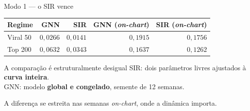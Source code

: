 \documentclass[aspectratio=169]{beamer}
\newcommand{\dest}[1]{\textcolor{ufprB}{\textbf{#1}}}
\begin{document}
\begin{frame}{Modo 1 --- o SIR vence}
  \begin{center}
  \begin{tabular}{lrrrr}
  \toprule
  \textbf{Regime} & \textbf{GNN} & \textbf{SIR} & \textbf{GNN (\emph{on-chart})} & \textbf{SIR (\emph{on-chart})} \\
  \midrule
  Viral 50 & $0{,}0266$ & \dest{$0{,}0141$} & $0{,}1915$ & \dest{$0{,}1756$} \\
  Top 200  & $0{,}0632$ & \dest{$0{,}0343$} & $0{,}1637$ & \dest{$0{,}1262$} \\
  \bottomrule
  \end{tabular}
  \end{center}
  \vfill
  \begin{alertblock}{A comparação é estruturalmente desigual}
    SIR: dois parâmetros livres ajustados à \dest{curva inteira}.\\
    GNN: modelo \dest{global e congelado}, semente de 12 semanas.
  \end{alertblock}
  \vfill
  \begin{center}
  \small A diferença se estreita nas semanas \emph{on-chart}, onde a dinâmica importa.
  \end{center}
  \vfill
\end{frame}
\end{document}
